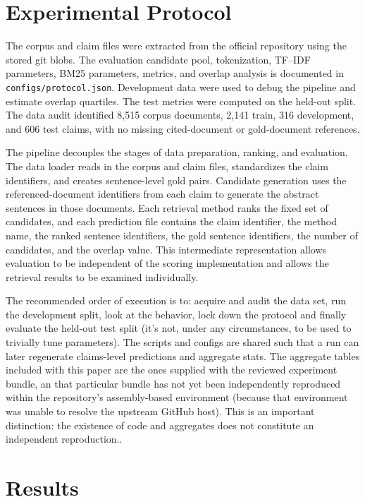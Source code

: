 \documentclass[11pt]{article}
\begin{document}
\section{Experimental Protocol}
The corpus and claim files were extracted from the official repository using the stored git blobs. The evaluation candidate pool, tokenization, TF--IDF parameters, BM25 parameters, metrics, and overlap analysis is documented in \texttt{configs/protocol.json}. Development data were used to debug the pipeline and estimate overlap quartiles. The test metrics were computed on the held-out split. The data audit identified 8,515 corpus documents, 2,141 train, 316 development, and 606 test claims, with no missing cited-document or gold-document references.

The pipeline decouples the stages of data preparation, ranking, and evaluation. The data loader reads in the corpus and claim files, standardizes the claim identifiers, and creates sentence-level gold pairs. Candidate generation uses the referenced-document identifiers from each claim to generate the abstract sentences in those documents. Each retrieval method ranks the fixed set of candidates, and each prediction file contains the claim identifier, the method name, the ranked sentence identifiers, the gold sentence identifiers, the number of candidates, and the overlap value. This intermediate representation allows evaluation to be independent of the scoring implementation and allows the retrieval results to be examined individually.

The recommended order of execution is to: acquire and audit the data set, run the development split, look at the behavior, lock down the protocol and finally evaluate the held-out test split (it's not, under any circumstances, to be used to trivially tune parameters). The scripts and configs are shared such that a run can later regenerate claims-level predictions and aggregate stats. The aggregate tables included with this paper are the ones supplied with the reviewed experiment bundle, an that particular bundle has not yet been independently reproduced within the repository's assembly-based environment (because that environment was unable to resolve the upstream GitHub host). This is an important distinction: the existence of code and aggregates does not constitute an independent reproduction..

\section{Results}
\end{document}
